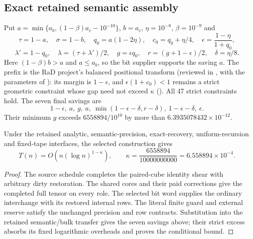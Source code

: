 \subsection{Exact retained semantic assembly}
Put $a=\min\{a_b,(1-\beta)a_c-10^{-10}\}$, $b=a_c$, $\eta=10^{-8}$, $\beta=10^{-9}$ and
\[
 \tau=1-a,\quad\sigma=1-b,\quad q_0=a(1-2\eta),\quad
 c_0=q_0+\eta/4,\quad
 \epsilon=\frac{1-\eta}{1+q_0},
\]
\[
 \lambda'=1-q_0,\quad\lambda=(\tau+\lambda')/2,\quad
 g=\epsilon q_0,\quad r=(g+1-\epsilon)/2,\quad\delta=\eta/8.
\]
Here $(1-\beta)b>a$ and $a\le a_b$, so the bit supplier supports the saving
$a$. The prefix is the RaD project's balanced positional transform
(reviewed in ,
with the parameters of ):
its margin is $1-\epsilon$, and $\epsilon(1+c_0)<1$ remains a strict geometric
constraint whose gap need not exceed $\kappa$
(). All 47 strict constraints hold.
The seven final savings are
\[
 1-\epsilon,\ a,\ g,\ a,\
 \min(1-\epsilon-\delta,r-\delta),\ 1-\epsilon-\delta,\ \epsilon.
\]
Their minimum $g$ exceeds $6558894/10^{10}$ by more than
$6.3935078432\times10^{-12}$.
\begin{theorem}
Under the retained analytic, semantic-precision, exact-recovery,
uniform-recursion and fixed-tape interfaces, the selected construction gives
\[
 T(n)=O\!\left(n(\log n)^{1-\kappa}\right),\qquad
 \boxed{\kappa=\frac{6558894}{10000000000}=6.558894\times10^{-4}}.
\]
\end{theorem}
\begin{proof}
The source schedule completes the paired-cube identity shear with arbitrary
dirty restoration. The shared cores and their paid corrections give the
completed full tensor on every role. The selected bit word supplies the
ordinary interchange with its restored internal rows. The literal finite
guard and external reserve satisfy the unchanged precision and row
contracts. Substitution into the retained semantic/bulk transfer gives the
seven savings above; their strict excess absorbs its fixed logarithmic
overheads and proves the conditional bound.
\end{proof}
